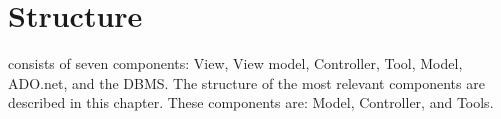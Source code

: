 \section{Structure}
\hdesk[] consists of seven components:
View, View model, Controller, Tool, Model, ADO.net, and the DBMS.
The structure of the most relevant components are described in this chapter.
These components are: Model, Controller, and Tools.
